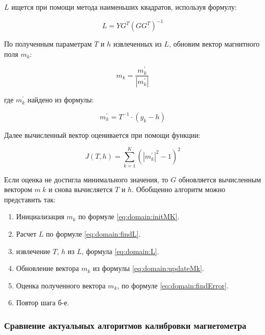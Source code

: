 $L$ ищется при помощи метода наименьших квадратов, используя формулу:

\begin{equation}
    \label{eq:domain:findL}
    L=YG^{T}(GG^{T})^{-1}
  \end{equation}

По полученным параметрам $T$ и $h$ извлеченных из $L$, обновим вектор магнитного поля $m_{k}$:

\begin{equation}
    \label{eq:domain:updateMk}
    m_{k}=\frac{m_{k}^{'}}{\left|m_{k}^{'}\right|}
  \end{equation}

где $m_{k}^{'}$ найдено из формулы:

\begin{equation}
    \label{eq:domain:findNewMk}
    m_{k}^{'}=T^{-1} \cdot (y_{k}-h)
  \end{equation}

Далее вычисленный вектор оценивается при помощи функции:

\begin{equation}
    \label{eq:domain:findError}
    J(T, h) = \sum_{k=1}^{K}(|m_{k}^{'}|^{2}-1)^{2}
  \end{equation}

Если оценка не достигла минимального значения, то $G$ обновляется вычисленным вектором $m~k$ и снова вычисляется $T$ и $h$.
Обобщенно алгоритм можно представить так:
\begin{enumerate}
    \item Инициализация $m_{k}$ по формуле \ref{eq:domain:initMK}.
    \item Расчет $L$ по формуле \ref{eq:domain:findL}.
    \item извлечение $T$, $h$ из $L$, формула \ref{eq:domain:L}.
    \item Обновление вектора $m_{k}$ из формулы \ref{eq:domain:updateMk}.
    \item Оценка полученного вектора $m_{k}$, по формуле \ref{eq:domain:findError}.
    \item Повтор шага б-е.
\end{enumerate}

\subsubsection{Сравнение актуальных алгоритмов калибровки магнетометра}

